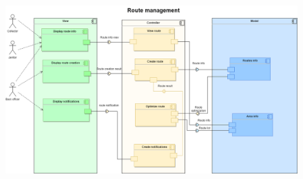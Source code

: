 \documentclass[a4paper]{article}
\begin{document}
\begin{enumerate}
\begin{figure}
            \includegraphics[width=6in]{Image/RouteManagementComponent.drawio.png}
        \end{figure}
        

\end{enumerate}
\end{document}
